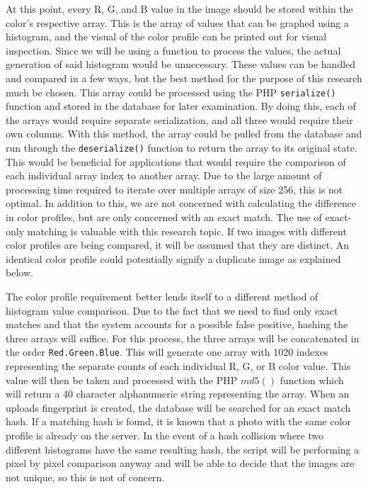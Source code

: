 At this point, every R, G, and B value in the image should be stored within the color's respective array. This is the array of values that can be graphed using a histogram, and the visual of the color profile can be printed out for visual inspection. Since we will be using a function to process the values, the actual generation of said histogram would be unnecessary. These values can be handled and compared in a few ways, but the best method for the purpose of this research much be chosen. This array could be processed using the PHP {\tt serialize()} function and stored in the database for later examination. By doing this, each of the arrays would require separate serialization, and all three would require their own columns. With this method, the array could be pulled from the database and run through the {\tt deserialize()} function to return the array to its original state. This would be beneficial for applications that would require the comparison of each individual array index to another array. Due to the large amount of processing time required to iterate over multiple arrays of size 256, this is not optimal. In addition to this, we are not concerned with calculating the difference in color profiles, but are only concerned with an exact match. The use of exact-only matching is valuable with this research topic. If two images with different color profiles are being compared, it will be assumed that they are distinct. An identical color profile could potentially signify a duplicate image as explained below.

The color profile requirement better lends itself to a different method of histogram value comparison. Due to the fact that we need to find only exact matches and that the system accounts for a possible false positive, hashing the three arrays will suffice. For this process, the three arrays will be concatenated in the order {\tt Red.Green.Blue}. This will generate one array with 1020 indexes representing the separate counts of each individual R, G, or B color value. This value will then be taken and processed with the PHP $md5()$ function which will return a 40 character alphanumeric string representing the array. When an uploads fingerprint is created, the database will be searched for an exact match hash. If a matching hash is found, it is known that a photo with the same color profile is already on the server. In the event of a hash collision where two different histograms have the same resulting hash, the script will be performing a pixel by pixel comparison anyway and will be able to decide that the images are not unique, so this is not of concern.


